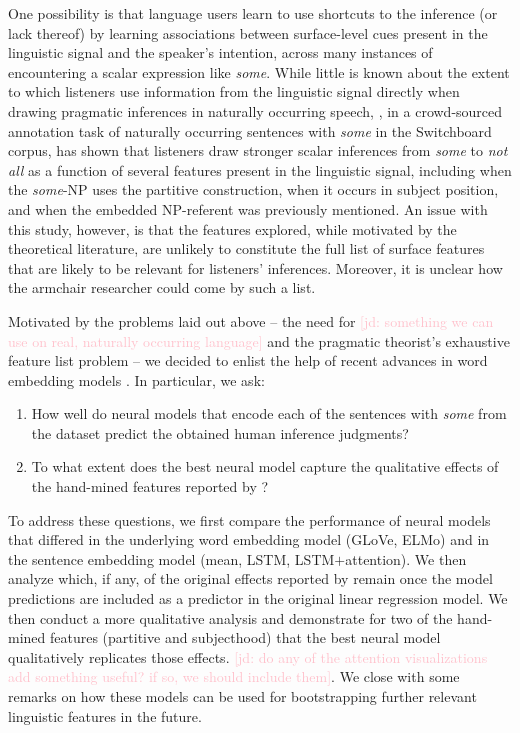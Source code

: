 \documentclass[10pt,letterpaper]{article}
\newcommand{\jd}[1]{\textcolor{Pink}{[jd: #1]}}
\begin{document}
One possibility is that language users learn to use shortcuts to the inference (or lack thereof) by learning associations between surface-level cues present in the linguistic signal and the speaker's intention, across many instances of encountering a scalar expression like \emph{some}.  While little is known about the extent to which listeners use information from the linguistic signal directly when drawing pragmatic inferences in naturally occurring speech, , in a crowd-sourced annotation task of naturally occurring sentences with \emph{some} in the Switchboard corpus,  has shown that listeners draw stronger scalar inferences from \emph{some} to \emph{not all} as a function of several features present in the linguistic signal, including when the \emph{some}-NP uses the partitive construction, when it occurs in subject position, and when the embedded NP-referent was previously mentioned. An issue with this study, however, is that the features explored, while motivated by the theoretical literature, are unlikely to constitute the full list of surface features that are likely to be relevant for listeners' inferences. Moreover, it is unclear how the armchair researcher could come by such a list.

Motivated by the problems laid out above -- the need for \jd{something we can use on real, naturally occurring language} and the pragmatic theorist's exhaustive feature list problem -- we decided to enlist the help of recent advances in word embedding models \cite{Pennington2014, Peters2018,XXX}. In particular, we ask: 

\begin{enumerate}
	\item How well do neural models that encode each of the sentences with \emph{some} from the  dataset  predict the obtained human inference judgments? 
	\item To what extent does the best neural model capture the qualitative effects of the hand-mined features reported by ?
\end{enumerate}

To address these questions, we first compare the performance of neural models that differed in the underlying word embedding model (GLoVe, ELMo) and in the sentence embedding model (mean, LSTM, LSTM$+$attention). We then analyze which, if any, of the original effects reported by  remain once the model predictions are included as a predictor in the original linear regression model. We then conduct a more qualitative analysis and demonstrate for two of the hand-mined features (partitive and subjecthood) that the best neural model qualitatively replicates those effects. \jd{do any of the attention visualizations add something useful? if so, we should include them}. We close with some remarks on how these models can be used for bootstrapping further relevant linguistic features in the future.
\end{document}
